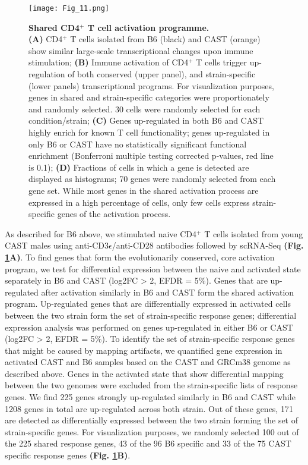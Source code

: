 \begin{figure}[!ht]
\centering
\texttt{[image: Fig\_11.png]}
\caption[Shared CD4$^+$ T cell activation programme]{\textbf{Shared CD4$^+$ T cell activation programme.}\\
\textbf{(A)} CD4$^+$ T cells isolated from B6 (black) and CAST (orange) show similar large-scale transcriptional changes upon immune stimulation; \textbf{(B)} Immune activation of CD4$^+$ T cells trigger up-regulation of both conserved (upper panel), and strain-specific (lower panels) transcriptional programs. For visualization purposes, genes in shared and strain-specific categories were proportionately and randomly selected. 30 cells were randomly selected for each condition/strain; \textbf{(C)} Genes up-regulated in both B6 and CAST highly enrich for known T cell functionality; genes up-regulated in only B6 or CAST have no statistically significant functional enrichment (Bonferroni multiple testing corrected p-values, red line is 0.1); \textbf{(D)} Fractions of cells in which a gene is detected are displayed as histograms; 70 genes were randomly selected from each gene set. While most genes in the shared activation process are expressed in a high percentage of cells, only few cells express strain-specific genes of the activation process.}
\label{fig1:shared_activation}
\end{figure}


As described for B6 above, we stimulated naive CD4$^+$ T cells isolated from young CAST males using anti-CD3$\epsilon$/anti-CD28 antibodies followed by scRNA-Seq \textbf{(Fig. \ref{fig1:shared_activation}A)}. To find genes that form the evolutionarily conserved, core activation program, we test for differential expression between the naive and activated state separately in B6 and CAST (log2FC > 2, EFDR = 5\%). Genes that are up-regulated after activation similarly in B6 and CAST form the shared activation program. Up-regulated genes that are differentially expressed in activated cells between the two strain form the set of strain-specific response genes; differential expression analysis was performed on genes up-regulated in either B6 or CAST (log2FC > 2, EFDR = 5\%). To identify the set of strain-specific response genes that might be caused by mapping artifacts, we quantified gene expression in activated CAST and B6 samples based on the CAST and GRCm38 genome as described above. Genes in the activated state that show differential mapping between the two genomes were excluded from the strain-specific lists of response genes. We find 225 genes strongly up-regulated similarly in B6 and CAST while 1208 genes in total are up-regulated across both strain. Out of these genes, 171 are detected as differentially expressed between the two strain forming the set of strain-specific genes. For visualization purposes, we randomly selected 100 out of the 225 shared response genes, 43 of the 96 B6 specific and 33 of the 75 CAST specific response genes \textbf{(Fig. \ref{fig1:shared_activation}B)}.\\


